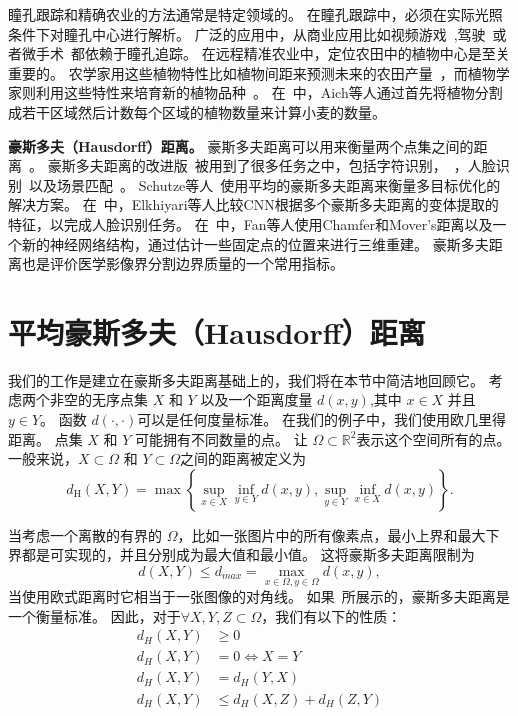 \documentclass[10pt,twocolumn,letterpaper,UTF8]{article}
\begin{document}
瞳孔跟踪和精确农业的方法通常是特定领域的。
在瞳孔跟踪中，必须在实际光照条件下对瞳孔中心进行解析。
广泛的应用中，从商业应用比如视频游戏~\cite{eyetracking_book},驾驶~\cite{applegan,copilot}或者微手术~\cite{fuhl2016_2}都依赖于瞳孔追踪。
在远程精准农业中，定位农田中的植物中心是至关重要的。
农学家用这些植物特性比如植物间距来预测未来的农田产量~\cite{thornley_1983,sui_2011,tokatlidis_2004,farnham2001,chauhan2011}，而植物学家则利用这些特性来培育新的植物品种~\cite{araus_2014,neilson_2015}。
在~\cite{aich2018}中，Aich等人通过首先将植物分割成若干区域然后计数每个区域的植物数量来计算小麦的数量。

\textbf{豪斯多夫（Hausdorff）距离。}
豪斯多夫距离可以用来衡量两个点集之间的距离~\cite{attouch1991}。
豪斯多夫距离的改进版~\cite{dubuisson1994}被用到了很多任务之中，包括字符识别，~\cite{lu2001}，人脸识别~\cite{lin2003}以及场景匹配~\cite{lin2003}。
Schutze等人~\cite{schutze2012}使用平均的豪斯多夫距离来衡量多目标优化的解决方案。
在~\cite{elkhiyari2017}中，Elkhiyari等人比较CNN根据多个豪斯多夫距离的变体提取的特征，以完成人脸识别任务。
在~\cite{fan2017}中，Fan等人使用Chamfer和Mover's距离以及一个新的神经网络结构，通过估计一些固定点的位置来进行三维重建。
豪斯多夫距离也是评价医学影像界分割边界质量的一个常用指标。

\section{平均豪斯多夫（Hausdorff）距离}
我们的工作是建立在豪斯多夫距离基础上的，我们将在本节中简洁地回顾它。
考虑两个非空的无序点集 $X$ 和 $Y$ 以及一个距离度量 $d(x,y)$,其中 $x \in X$ 并且 $y \in Y$。
函数 $d(\cdot,\cdot)$可以是任何度量标准。
在我们的例子中，我们使用欧几里得距离。
点集 $X$ 和 $Y$ 可能拥有不同数量的点。
让 $\Omega \subset \mathbb{R}^2$表示这个空间所有的点。
一般来说，$X \subset \Omega$ 和 $Y \subset \Omega$之间的距离被定义为
\begin{equation}
  \label{eq:hausdorff}
  d_{\text{H}}(X, Y) = \max \left\{ \sup_{x\in X} \inf_{y\in Y} d(x, y), \sup_{y\in Y} \inf_{x\in X} d(x, y) \right\}  .
\end{equation}

当考虑一个离散的有界的 $\Omega $，比如一张图片中的所有像素点，最小上界和最大下界都是可实现的，并且分别成为最大值和最小值。
这将豪斯多夫距离限制为
\begin{equation}
  \label{eq:dmax}
  d(X, Y) \le d_{max} = \max_{x\in \Omega, y \in \Omega} d(x, y)  ,
\end{equation}
当使用欧式距离时它相当于一张图像的对角线。
如果~\cite{attouch1991}所展示的，豪斯多夫距离是一个衡量标准。
因此，对于$\forall X, Y, Z \subset \Omega$，我们有以下的性质：
\begin{subequations}
\label{all1}
 \begin{align}
  \label{eq:hausdorff1}
     d_H(X, Y) & \ge 0 \quad   \\
  \label{eq:hausdorff2}
  d_H(X, Y) &= 0 \iff X = Y  \\
  \label{eq:hausdorff3}
  d_H(X, Y) &= d_H(Y, X)  \\
  \label{eq:hausdorff4}
  d_H(X, Y) &\le d_H(X, Z) + d_H(Z, Y)
 \end{align}
\end{subequations}
\end{document}
